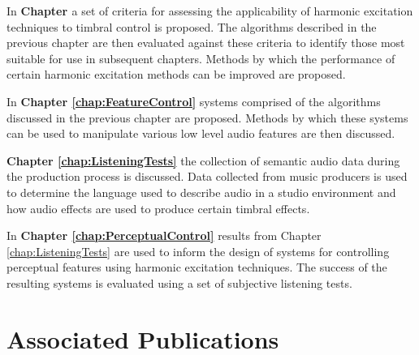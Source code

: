 	In {\bf{Chapter }} a set of criteria for assessing the applicability of
	harmonic excitation techniques to timbral control is proposed. The algorithms described in the previous chapter are
	then evaluated against these criteria to identify those most suitable for use in subsequent chapters. Methods by
	which the performance of certain harmonic excitation methods can be improved are proposed.


	In {\bf{Chapter \ref{chap:FeatureControl}}} systems comprised of the algorithms discussed in the previous
	chapter are proposed. Methods by which these systems can be used to manipulate various low level audio features are
	then discussed.

	{\bf{Chapter \ref{chap:ListeningTests}}} the collection of semantic audio data during the production process is
	discussed. Data collected from music producers is used to determine the language used to describe audio in a studio
	environment and how audio effects are used to produce certain timbral effects.

	In {\bf{Chapter \ref{chap:PerceptualControl}}} results from Chapter \ref{chap:ListeningTests} are used to inform the
	design of systems for controlling perceptual features using harmonic excitation techniques. The success of the
	resulting systems is evaluated using a set of subjective listening tests.

\section{Associated Publications}
\label{sec:Introduction-AssociatedPublications}
